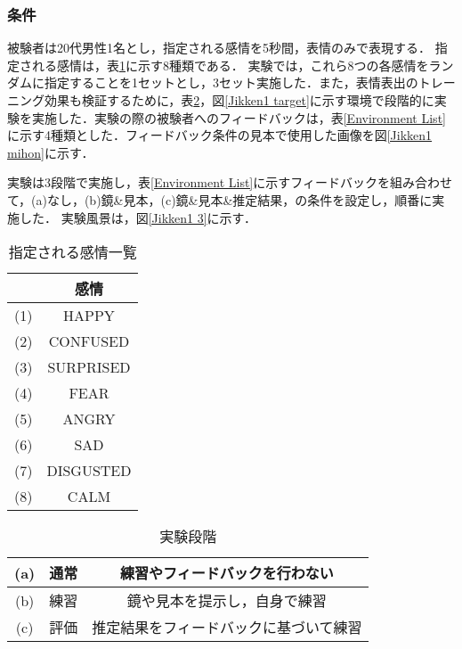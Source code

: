 \documentclass[titlepage]{jarticle}
\begin{document}
\subsubsection{条件}
被験者は20代男性1名とし，指定される感情を5秒間，表情のみで表現する．
指定される感情は，表\ref{Emotion List}に示す8種類である．
実験では，これら8つの各感情をランダムに指定することを1セットとし，3セット実施した．また，表情表出のトレーニング効果も検証するために，表\ref{Experiment environment}，図\ref{Jikken1 target}に示す環境で段階的に実験を実施した．実験の際の被験者へのフィードバックは，表\ref{Environment List}に示す4種類とした．フィードバック条件の見本で使用した画像を図\ref{Jikken1 mihon}に示す．

実験は3段階で実施し，表\ref{Environment List}に示すフィードバックを組み合わせて，(a)なし，(b)鏡\&見本，(c)鏡\&見本\&推定結果，の条件を設定し，順番に実施した．
実験風景は，図\ref{Jikken1 3}に示す．

\begin{table}[h]
\centering
\caption{指定される感情一覧}
\begin{tabular}{|c||c|}
    \hline
		 & 感情 \\
	\hline
	\hline
		(1) & HAPPY \\
	\hline
		(2) & CONFUSED \\
	\hline
		(3) & SURPRISED \\
	\hline
		(4) & FEAR \\
	\hline
        (5) & ANGRY \\
	\hline
        (6) & SAD \\
	\hline
        (7) & DISGUSTED \\
	\hline
        (8) & CALM \\
	\hline
\end{tabular}
\label{Emotion List}
\end{table}

\begin{table}[h]
\centering
\caption{実験段階}
\begin{tabular}{|c|c|c|}
	\hline
		(a) & 通常 & 練習やフィードバックを行わない \\
	\hline
		(b) & 練習 & 鏡や見本を提示し，自身で練習 \\
	\hline
		(c) & 評価 & 推定結果をフィードバックに基づいて練習 \\
	\hline
\end{tabular}
\label{Experiment environment}
\end{table}
\end{document}

